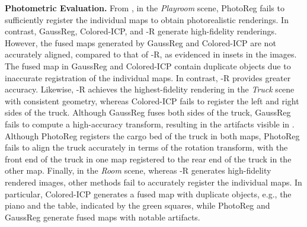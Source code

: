 \smallskip
\noindent\textbf{Photometric Evaluation.}
From , in the \emph{Playroom} scene, PhotoReg fails to sufficiently register the individual maps to obtain photorealistic renderings. In contrast, GaussReg, Colored-ICP, and \algname-R generate high-fidelity renderings. However, the fused maps generated by GaussReg and Colored-ICP are not accurately aligned, compared to that of \algname-R, as evidenced in insets in the images. The fused map in GaussReg and Colored-ICP contain duplicate objects due to inaccurate registration of the individual maps. In contrast, \algname-R provides greater accuracy. Likewise, \algname-R achieves the highest-fidelity rendering in the \emph{Truck} scene with consistent geometry, whereas Colored-ICP fails to register the left and right sides of the truck. Although GaussReg fuses both sides of the truck, GaussReg fails to compute a high-accuracy transform, resulting in the artifacts visible in . Although PhotoReg registers the cargo bed of the truck in both maps, PhotoReg fails to align the truck accurately in terms of the rotation transform, with the front end of the truck in one map registered to the rear end of the truck in the other map.
Finally, in the \emph{Room} scene, whereas \algname-R generates high-fidelity rendered images, other methods fail to accurately register the individual maps. In particular, Colored-ICP generates a fused map with duplicate objects, e.g., the piano and the table, indicated by the green squares, while PhotoReg and GaussReg generate fused maps with notable artifacts.


